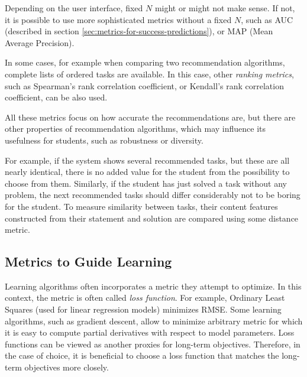 Depending on the user interface, fixed $N$ might or might not make sense.
If not, it is possible to use more sophisticated metrics without a fixed $N$,
such as AUC (described in section \ref{sec:metrics-for-success-predictions}),
or MAP (Mean Average Precision).

In some cases, for example when comparing two recommendation algorithms,
complete lists of ordered tasks are available.
In this case, other \emph{ranking metrics},
  such as Spearman's rank correlation coefficient,
  or Kendall's rank correlation coefficient,
  can be also used.

All these metrics focus on how accurate the recommendations are,
but there are other properties of recommendation algorithms,
which may influence its usefulness for students,
such as robustness or diversity.

For example, if the system shows several recommended tasks,
but these are all nearly identical, there is no added value
for the student from the possibility to choose from them.
Similarly, if the student has just solved a task
without any problem, the next recommended tasks should
differ considerably not to be boring for the student.
To measure similarity between tasks, their content features
constructed from their statement and solution are compared
using some distance metric.


\subsection{Metrics to Guide Learning}
\label{sec:metrics-to-guide-learning}

Learning algorithms often incorporates a metric they attempt to optimize.
In this context, the metric is often called \emph{loss function}.
For example,
  Ordinary Least Squares (used for linear regression models) minimizes RMSE.
Some learning algorithms, such as gradient descent,
  allow to minimize arbitrary metric
  for which it is easy to compute partial derivatives with respect to model parameters.
Loss functions can be viewed as another proxies for long-term objectives.
Therefore, in the case of choice, it is beneficial to choose a loss function
  that matches the long-term objectives more closely.

